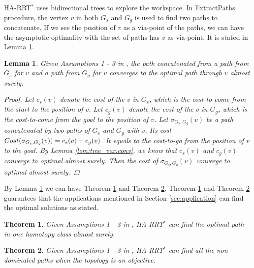 \documentclass[letterpaper, 10 pt, conference]{ieeeconf}
\newtheorem{thm}{Theorem}
\newtheorem{lem}{Lemma}
\begin{document}
HA-RRT$^{*}$ uses bidirectional trees to explore the workspace.
In {\sc ExtractPaths} procedure, the vertex $ v $ in both $ G_{s} $ and $ G_{g} $ is used to find two paths to concatenate.
If we see the position of $ v $ as a via-point of the paths, we can have the asymptotic optimality with the set of paths has $ v $ as via-point.
It is stated in Lemma \ref{lem:optimal_via_point}.

\begin{lem}
\label{lem:optimal_via_point}
Given Assumptions 1 - 3 in \cite{Karaman-RSS-10},
the path concatenated from a path from $ G_{s} $ for $ v $ and a path from $ G_{g} $ for $ v $ converges to the optimal path through $ v $ almost surely. 
\begin{proof}
Let $ c_{s} (v) $ denote the cost of the $ v $ in $ G_{s} $, which is the cost-to-come from the start to the position of $ v $.
Let $ c_{g} (v) $ denote the cost of the $ v $ in $ G_{g} $, which is the cost-to-come from the goal to the position of $ v $.
Let $ \sigma_{G_{s},G_{g}} (v) $ be a path concatenated by two paths of $ G_{s} $ and $ G_{g} $ with $ v $. 
Its cost $ {\sc Cost} (\sigma_{G_{s},G_{g}} (v)) =  c_{s} (v) + c_{g} (v) $.
It equals to the cost-to-go from the position of $ v $ to the goal.
By Lemma \ref{lem:tree_vex:conv}, we know that $ c_{s} (v) $ and $ c_{g} (v) $ converge to optimal almost surely.
Then the cost of $ \sigma_{G_{s},G_{g}} (v) $ converge to optimal almost surely. 
\end{proof}
\end{lem}

By Lemma \ref{lem:optimal_via_point} we can have Theorem \ref{thm:constrained_optimality} and Theorem \ref{thm:homotopy_pref:optimal}.
Theorem \ref{thm:constrained_optimality} and Theorem \ref{thm:homotopy_pref:optimal} guarantees that the applications mentioned in Section \ref{sec:application} can find the optimal solutions as stated.

\begin{thm}
\label{thm:constrained_optimality}
Given Assumptions 1 - 3 in \cite{Karaman-RSS-10},
HA-RRT$^{*}$ can find the optimal path in one homotopy class almost surely.
\end{thm}

\begin{thm}
\label{thm:homotopy_pref:optimal}
Given Assumptions 1 - 3 in \cite{Karaman-RSS-10}, 
HA-RRT$^{*}$ can find all the non-dominated paths when the topology is an objective.
\end{thm}
\end{document}
